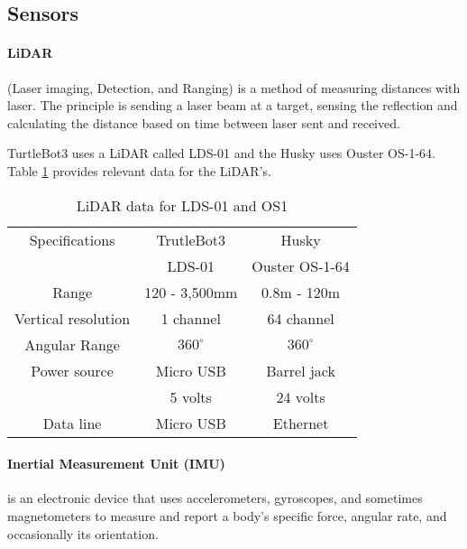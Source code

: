 \subsection{Sensors}

\paragraph{LiDAR}(Laser imaging, Detection, and Ranging) is a method of measuring distances with laser. The principle is sending a laser beam at a target, sensing the reflection and calculating the distance based on time between laser sent and received. 

TurtleBot3 uses a LiDAR called LDS-01 and the Husky uses Ouster OS-1-64. Table \ref{tab:lidar_data} provides relevant data for the LiDAR's. 

\begin{table}[h]
    \centering
    \begin{tabular}{c|c|c}
        Specifications          & TrutleBot3        & Husky             \\ 
                                & LDS-01            & Ouster OS-1-64    \\ \hline
        Range                   & 120 - 3,500mm     & 0.8m - 120m       \\ \hline
        Vertical resolution     & 1 channel         & 64 channel        \\ \hline
        Angular Range           & $360^\circ$       & $360^\circ$       \\ \hline  
        Power source            & Micro USB         & Barrel jack       \\  
                                & 5 volts           & 24 volts          \\ \hline
        Data line               & Micro USB         & Ethernet          \\       
    \end{tabular}
    \caption{LiDAR data for LDS-01\cite{lds01} and OS1 \cite{OS1Datasheet}}
    \label{tab:lidar_data}
\end{table}

\paragraph{Inertial Measurement Unit (IMU)} is an electronic device that uses accelerometers, gyroscopes, and sometimes magnetometers to measure and report a body's specific force, angular rate, and occasionally its orientation.

